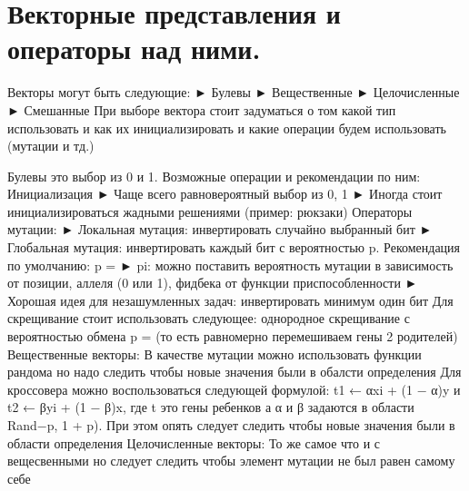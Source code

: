 \section{Векторные представления и операторы над ними.}
Векторы могут быть следующие: 
► Булевы
► Вещественные
► Целочисленные
► Смешанные
При выборе вектора стоит задуматься о том какой тип использовать и как их инициализировать и какие операции будем использовать (мутации и тд.)

Булевы это выбор из 0 и 1. 
Возможные операции и рекомендации по ним:
Инициализация
► Чаще всего равновероятный выбор из {0, 1}
► Иногда стоит инициализироваться жадными решениями (пример: рюкзаки)
Операторы мутации:
► Локальная мутация: инвертировать случайно выбранный бит
► Глобальная мутация: инвертировать каждый бит с вероятностью p. Рекомендация по умолчанию: p = 
► pi: можно поставить вероятность мутации в зависимость от позиции, аллеля (0 или 1), фидбека от функции приспособленности
► Хорошая идея для незашумленных задач: инвертировать минимум один бит
Для скрещивание стоит использовать следующее: однородное скрещивание с вероятностью обмена p =  (то есть равномерно перемешиваем гены 2 родителей)
Вещественные векторы:
В качестве мутации можно использовать функции рандома но надо следить чтобы новые значения были в обалсти определения
Для кроссовера можно воспользоваться следующей формулой: t1 ← αxi + (1 − α)y и t2 ← βyi + (1 − β)x, где t это гены ребенков а α и β задаются в области Rand−p, 1 + p). При этом опять следует следить чтобы новые значения были в области определения
Целочисленные векторы:
То же самое что и с вещесвенными но следует следить чтобы элемент мутации не был равен самому себе

